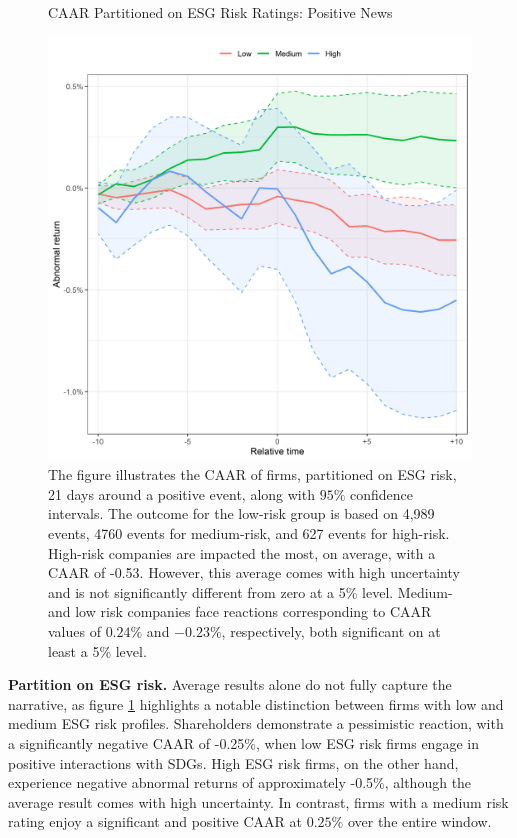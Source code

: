 \begin{figure} [h]
\begin{minipage}[t]{0.49\textwidth}
     \label{fig:ST_pos_news}
     \end{minipage}
     \hfill
     \begin{minipage}[t]{0.49\textwidth}
       \centering
    \caption{CAAR Partitioned on ESG Risk Ratings: Positive News}
    \includegraphics[width=\textwidth]{Projekt/1.Figures analysis/ST_positive_ESG.png}
    \caption*{\footnotesize The figure illustrates the CAAR of firms, partitioned on ESG risk, 21 days around a positive event, along with $95\%$ confidence intervals. The outcome for the low-risk group is based on 4,989 events, 4760 events for medium-risk, and 627 events for high-risk. High-risk companies are impacted the most, on average, with a CAAR of -0.53. However, this average comes with high uncertainty and is not significantly different from zero at a 5\% level. Medium- and low risk companies face reactions corresponding to CAAR values of $0.24\%$ and $-0.23\%$, respectively, both significant on at least a 5\% level.}
    \label{fig:ST_pos_ESG}
     \end{minipage}
        
\end{figure}

\noindent \textbf{Partition on ESG risk.} Average results alone do not fully capture the narrative, as figure \ref{fig:ST_pos_ESG} highlights a notable distinction between firms with low and medium ESG risk profiles. Shareholders demonstrate a pessimistic reaction, with a significantly negative CAAR of -0.25\%, when low ESG risk firms engage in positive interactions with SDGs. 
High ESG risk firms, on the other hand, experience negative abnormal returns of approximately -0.5\%, although the average result comes with high uncertainty. In contrast, firms with a medium risk rating enjoy a significant and positive CAAR at $0.25\%$ over the entire  window. 

